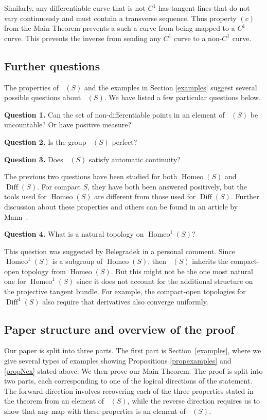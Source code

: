 \documentclass[sn-mathphys-num]{sn-jnl}%
\theoremstyle{thmstyleone}%
\theoremstyle{thmstyletwo}%
\theoremstyle{thmstylethree}%
\DeclareMathOperator{\homeo}{Homeo}
\DeclareMathOperator{\diff}{Diff}
\DeclareMathOperator{\thomeo}{Homeo^{1}}
\begin{document}
Similarly,  any differentiable curve that is not $C^1$ has tangent lines that do not vary continuously and must contain a transverse sequence.  Thus property $(c)$ from the Main Theorem prevents a such a curve from being mapped to a $C^1$ curve.  This prevents the inverse from sending any $C^1$ curve to a non-$C^1$ curve. 





\subsection{Further questions}\label{introquestions}
The properties of $\thomeo(S)$ and the examples in Section \ref{examples} suggest several possible questions about $\thomeo(S)$.  We have listed a few particular questions below.

\medskip 
\noindent \textbf{Question 1.} Can the set of non-differentiable points in an element of $\thomeo(S)$ be uncountable? Or have positive measure?


\medskip
\noindent \textbf{Question 2.} Is the group $\thomeo(S)$ perfect?

\medskip
\noindent \textbf{Question 3.} Does $\thomeo(S)$ satisfy automatic continuity?

\medskip 

\noindent The previous two questions have been studied for both $\homeo(S)$ and $\diff(S)$. For compact $S$, they have both been answered positively,  but the tools used for $\homeo(S)$ are different from those used for $\diff(S)$.    
Further discussion about these properties and others can be found in an article by Mann~\cite{Mann}. 

\medskip

\noindent \textbf{Question 4.} What is a natural topology on $\homeo^1(S)$? 

\medskip

\noindent  This question was suggested by Belegradek in a personal comment.  Since $\homeo^1(S)$ is a subgroup of $\homeo(S)$, then $\thomeo(S)$ inherits the compact-open topology from $\homeo(S)$.  But this might not be the one most natural one for $\homeo^1(S)$ since it does not account for the additional structure on the projective tangent bundle.  For example, the compact-open topologies for $\diff^1(S)$ also require that derivatives also converge uniformly.   


\subsection{Paper structure and overview of the proof}\label{introproofidea}
Our paper is split into three parts.  The first part is Section~\ref{examples}, where we give several types of examples showing Propositions \ref{propexamples} and \ref{propNex} stated above.  We then prove our Main Theorem.  The proof is split into two parts, each corresponding to one of the logical directions of the statement.  The forward direction involves recovering each of the three properties stated in the theorem from an element of $\thomeo(S)$,  while the reverse direction requires us to show that any map with these properties is an element of $\thomeo(S)$.  
\end{document}
